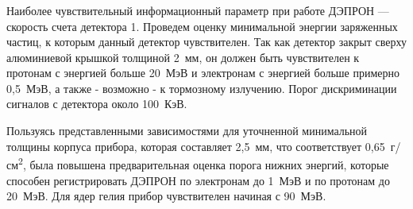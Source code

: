 \documentclass[t, aspectratio=43]{beamer}
\begin{document}
\begin{frame}
\frametitle{\insertsection} 
\framesubtitle{\insertsubsection}
\begin{columns}[T]
\begin{column}{.5\textwidth}
	\begin{block}{}			
		{\tiny 
		Наиболее чувствительный информационный параметр при работе ДЭПРОН --- скорость счета детектора 1. Проведем оценку минимальной энергии заряженных частиц, к которым данный детектор чувствителен. Так как детектор закрыт сверху алюминиевой крышкой толщиной 2~мм, он должен быть чувствителен к протонам с энергией больше 20~МэВ и электронам с энергией больше примерно 0,5~МэВ, а также - возможно - к тормозному излучению. Порог дискриминации сигналов с детектора около 100~КэВ. %
		
		Пользуясь представленными зависимостями для уточненной минимальной толщины корпуса прибора, которая составляет 2,5~мм, что соответствует 0,65~г/см\textsuperscript{2}, была повышена предварительная оценка порога нижних энергий, которые способен регистрировать ДЭПРОН по электронам до 1~МэВ и по протонам до 20~МэВ. Для ядер гелия прибор чувствителен начиная с 90~МэВ. %
		
}
\end{block}
\end{column}
\end{columns}
\end{frame}
\end{document}
